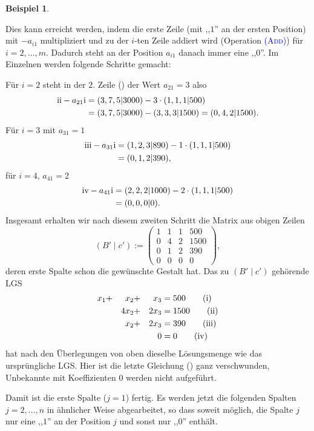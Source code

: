 \documentclass[a4paper,11pt,oneside]{article}
\theoremstyle{definition}
\newtheorem{example}{Beispiel}
\def\RM#1{\uppercase\expandafter{\romannumeral #1\relax}}
\def\OP#1{\textcolor{blue}{(\textnormal{\textrm{\textsc{#1}})}}}
\begin{document}
\begin{example}
\begin{enumerate}
Dies kann erreicht werden, indem die erste Zeile (mit ,,$1$'' an der ersten Position) mit $-a_{i1}$ multipliziert und zu der $ i$-ten Zeile addiert wird (Operation \OP{Add}) für $i=2,\ldots,m$. Dadurch steht an der Position $a_{i1}$ danach immer eine ,,$0$''. Im Einzelnen werden folgende Schritte gemacht:

Für $ i=2$ steht in der  $2.$ Zeile (\RM{2}) der Wert  $a_{21}=3$ also
\begin{alignat*}{1}
\mbox{\RM{2}}-a_{21}\mbox{\RM{1}}&=(3,7,5|3000)-3\cdot(1,1,1|500)\\
&=(3,7,5|3000)- (3,3,3|1500)=(0,4,2|1500).
\end{alignat*}
Für $i=3$ mit $a_{31}=1$
\begin{alignat*}{1}
\mbox{\RM{3}}-a_{31}\mbox{\RM{1}}&=(1,2,3|890)-1\cdot(1,1,1|500)\\
&=(0,1,2|390),
\end{alignat*}
für $i=4$, $a_{41}=2$
\begin{alignat*}{1}
\mbox{\RM{4}}-a_{41}\mbox{\RM{1}}&=(2,2,2|1000)-2\cdot(1,1,1|500)\\
&=(0,0,0|0).
\end{alignat*}
Insgesamt erhalten wir nach diesem zweiten Schritt die Matrix aus obigen Zeilen
$$
(B'\mid c'):=\left(\begin{array}{ccc|c}
1&1&1&500\\
0&4&2&1500\\
0&1&2&390\\
0&0&0&0
\end{array}\right),
$$
deren erste Spalte schon die gewünschte Gestalt hat. Das zu $ (B'\mid c')$ gehörende LGS
\begin{alignat}{3}
x_1&+&x_2&+&x_3&=500 \tag{\RM{1}}\\
&&4x_2&+&2x_3&=1500 \tag{\RM{2}}\\
&&x_2&+&2x_3&=390 \tag{\RM{3}}\\
&&&&0&=0\tag{\RM{4}}
\end{alignat}
hat nach den Überlegungen von oben dieselbe Lösungsmenge wie das ursprüngliche LGS. Hier ist die letzte Gleichung (\RM{4}) ganz verschwunden, Unbekannte mit Koeffizienten $0$ werden nicht aufgeführt.

Damit ist die erste Spalte ($j=1$) fertig. Es werden jetzt die folgenden Spalten $j=2,\ldots,n$ in ähnlicher Weise abgearbeitet, so dass soweit möglich, die Spalte $j$ nur eine ,,$1$'' an der Position $j$ und sonst nur ,,$0$'' enthält.


\end{enumerate}
\end{example}
\end{document}
